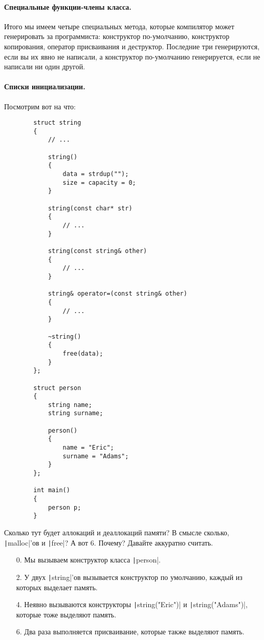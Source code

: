 \documentclass{article}
\begin{document}
    \paragraph{Специальные функции-члены класса.}
    Итого мы имеем четыре специальных метода, которые компилятор может генерировать за программиста: конструктор по-умолчанию, конструктор копирования, оператор присваивания и деструктор. Последние три генерируются, если вы их явно не написали, а конструктор по-умолчанию генерируется, если не написали ни один другой.
    \paragraph{Списки инициализации.}
    Посмотрим вот на что:
    \begin{verbatim}
        struct string
        {
            // ...

            string()
            {
                data = strdup("");
                size = capacity = 0;
            }
        
            string(const char* str)
            {
                // ...
            }

            string(const string& other)
            {
                // ...
            }

            string& operator=(const string& other)
            {
                // ...
            }

            ~string()
            {
                free(data);
            }
        };
        
        struct person
        {
            string name;
            string surname;

            person()
            {
                name = "Eric";
                surname = "Adams";
            }
        };

        int main()
        {
            person p;
        }
    \end{verbatim}
    Сколько тут будет аллокаций и деаллокаций памяти? В смысле сколько, \texttt|malloc|'ов и \texttt|free|? А вот 6. Почему? Давайте аккуратно считать.
    \begin{itemize}
        \item[0.] Мы вызываем конструктор класса \texttt|person|.
        \item[2.] У двух \texttt|string|'ов вызывается конструктор по умолчанию, каждый из которых выделает память.
        \item[4.] Неявно вызываются конструкторы \texttt|string("Eric")| и \texttt|string("Adams")|, которые тоже выделяют память.
        \item[6.] Два раза выполняется присваивание, которые также выделяют память.
    \end{itemize}
\end{document}

